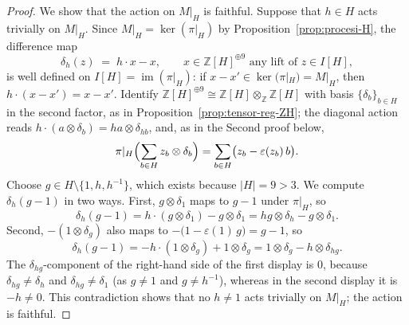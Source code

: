 \documentclass[12pt,a4paper]{article}
\theoremstyle{definition}
\begin{document}
\begin{proof}
We show that the action on \(M|_H\) is faithful.  Suppose that
\(h \in H\) acts trivially on \(M|_H\).  Since
\(M|_H = \ker(\pi|_H)\) by Proposition~\ref{prop:procesi-H}, the
difference map
\[
\delta_h(z) \;=\; h \cdot x - x,
\qquad x \in \mathbb{Z}[H]^{\oplus 9}
  \text{ any lift of } z \in I[H],
\]
is well defined on \(I[H] = \operatorname{im}(\pi|_H)\): if
\(x - x' \in \ker(\pi|_H) = M|_H\), then
\(h \cdot (x - x') = x - x'\).  Identify
\(\mathbb{Z}[H]^{\oplus 9} \cong \mathbb{Z}[H]
\otimes_{\mathbb{Z}} \mathbb{Z}[H]\) with basis
\(\{\delta_b\}_{b \in H}\) in the second factor, as in
Proposition~\ref{prop:tensor-reg-ZH}; the diagonal action reads
\(h \cdot (a \otimes \delta_b) = ha \otimes \delta_{hb}\),
and, as in the Second proof below,
\[
\pi|_H\Bigl( \sum_{b \in H} z_b \otimes \delta_b \Bigr)
  = \sum_{b \in H} \bigl( z_b - \varepsilon(z_b)\, b \bigr).
\]
Choose \(g \in H \setminus \{1, h, h^{-1}\}\), which exists
because \(|H| = 9 > 3\).  We compute \(\delta_h(g - 1)\) in two
ways.  First, \(g \otimes \delta_1\) maps to \(g - 1\) under
\(\pi|_H\), so
\[
\delta_h(g - 1)
  = h \cdot (g \otimes \delta_1) - g \otimes \delta_1
  = hg \otimes \delta_h - g \otimes \delta_1 .
\]
Second, \(-(1 \otimes \delta_g)\) also maps to
\(-\bigl( 1 - \varepsilon(1)\, g \bigr) = g - 1\), so
\[
\delta_h(g - 1)
  = - h \cdot (1 \otimes \delta_g) + 1 \otimes \delta_g
  = 1 \otimes \delta_g - h \otimes \delta_{hg} .
\]
The \(\delta_{hg}\)-component of the right-hand side of the first
display is \(0\), because \(\delta_{hg} \neq \delta_h\) and
\(\delta_{hg} \neq \delta_1\) (as \(g \neq 1\) and
\(g \neq h^{-1}\)), whereas in the second display it is \(-h
\neq 0\).
This contradiction shows that no \(h \neq 1\) acts trivially on
\(M|_H\); the action is faithful.
\end{proof}
\end{document}
